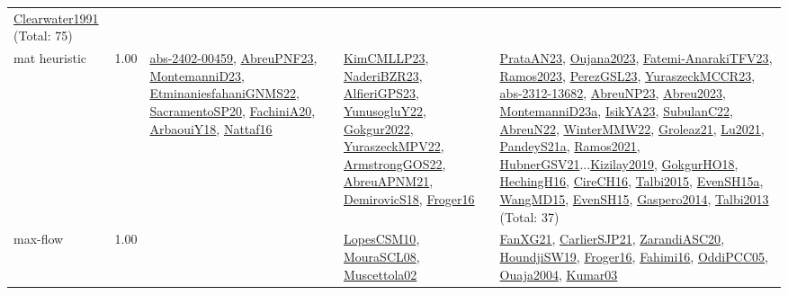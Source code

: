 {\begin{longtable}{p{3cm}r>{\raggedright\arraybackslash}p{6cm}>{\raggedright\arraybackslash}p{6cm}>{\raggedright\arraybackslash}p{8cm}}
\hyperref[detail:Clearwater1991]{Clearwater1991} (Total: 75)\\
\index{mat heuristic}\index{Algorithms!mat heuristic}mat heuristic &  1.00 & \hyperref[detail:abs-2402-00459]{abs-2402-00459}, \hyperref[detail:AbreuPNF23]{AbreuPNF23}, \hyperref[detail:MontemanniD23]{MontemanniD23}, \hyperref[detail:EtminaniesfahaniGNMS22]{EtminaniesfahaniGNMS22}, \hyperref[detail:SacramentoSP20]{SacramentoSP20}, \hyperref[detail:FachiniA20]{FachiniA20}, \hyperref[detail:ArbaouiY18]{ArbaouiY18}, \hyperref[detail:Nattaf16]{Nattaf16} & \hyperref[detail:KimCMLLP23]{KimCMLLP23}, \hyperref[detail:NaderiBZR23]{NaderiBZR23}, \hyperref[detail:AlfieriGPS23]{AlfieriGPS23}, \hyperref[detail:YunusogluY22]{YunusogluY22}, \hyperref[detail:Gokgur2022]{Gokgur2022}, \hyperref[detail:YuraszeckMPV22]{YuraszeckMPV22}, \hyperref[detail:ArmstrongGOS22]{ArmstrongGOS22}, \hyperref[detail:AbreuAPNM21]{AbreuAPNM21}, \hyperref[detail:DemirovicS18]{DemirovicS18}, \hyperref[detail:Froger16]{Froger16} & \hyperref[detail:PrataAN23]{PrataAN23}, \hyperref[detail:Oujana2023]{Oujana2023}, \hyperref[detail:Fatemi-AnarakiTFV23]{Fatemi-AnarakiTFV23}, \hyperref[detail:Ramos2023]{Ramos2023}, \hyperref[detail:PerezGSL23]{PerezGSL23}, \hyperref[detail:YuraszeckMCCR23]{YuraszeckMCCR23}, \hyperref[detail:abs-2312-13682]{abs-2312-13682}, \hyperref[detail:AbreuNP23]{AbreuNP23}, \hyperref[detail:Abreu2023]{Abreu2023}, \hyperref[detail:MontemanniD23a]{MontemanniD23a}, \hyperref[detail:IsikYA23]{IsikYA23}, \hyperref[detail:SubulanC22]{SubulanC22}, \hyperref[detail:AbreuN22]{AbreuN22}, \hyperref[detail:WinterMMW22]{WinterMMW22}, \hyperref[detail:Groleaz21]{Groleaz21}, \hyperref[detail:Lu2021]{Lu2021}, \hyperref[detail:PandeyS21a]{PandeyS21a}, \hyperref[detail:Ramos2021]{Ramos2021}, \hyperref[detail:HubnerGSV21]{HubnerGSV21}...\hyperref[detail:Kizilay2019]{Kizilay2019}, \hyperref[detail:GokgurHO18]{GokgurHO18}, \hyperref[detail:HechingH16]{HechingH16}, \hyperref[detail:CireCH16]{CireCH16}, \hyperref[detail:Talbi2015]{Talbi2015}, \hyperref[detail:EvenSH15a]{EvenSH15a}, \hyperref[detail:WangMD15]{WangMD15}, \hyperref[detail:EvenSH15]{EvenSH15}, \hyperref[detail:Gaspero2014]{Gaspero2014}, \hyperref[detail:Talbi2013]{Talbi2013} (Total: 37)\\
\index{max-flow}\index{Algorithms!max-flow}max-flow &  1.00 &  & \hyperref[detail:LopesCSM10]{LopesCSM10}, \hyperref[detail:MouraSCL08]{MouraSCL08}, \hyperref[detail:Muscettola02]{Muscettola02} & \hyperref[detail:FanXG21]{FanXG21}, \hyperref[detail:CarlierSJP21]{CarlierSJP21}, \hyperref[detail:ZarandiASC20]{ZarandiASC20}, \hyperref[detail:HoundjiSW19]{HoundjiSW19}, \hyperref[detail:Froger16]{Froger16}, \hyperref[detail:Fahimi16]{Fahimi16}, \hyperref[detail:OddiPCC05]{OddiPCC05}, \hyperref[detail:Ouaja2004]{Ouaja2004}, \hyperref[detail:Kumar03]{Kumar03}\\

\end{longtable}}
